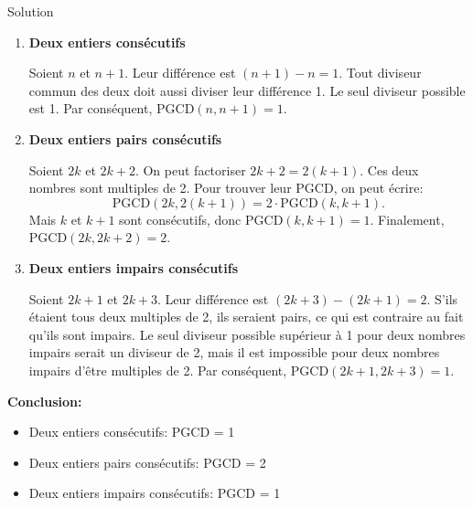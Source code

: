 \documentclass[a4paper,12pt]{article}
\begin{document}
\begin{solutionbox}{Solution}
    \begin{enumerate}
      \item \textbf{Deux entiers consécutifs}
    
      Soient $n$ et $n+1$.  
      Leur différence est $(n+1) - n = 1$.  
      Tout diviseur commun des deux doit aussi diviser leur différence 1.  
      Le seul diviseur possible est 1.  
      Par conséquent, $\mathrm{PGCD}(n, n+1) = 1$.
    
      \item \textbf{Deux entiers pairs consécutifs}
    
      Soient $2k$ et $2k+2$.  
      On peut factoriser $2k+2 = 2(k+1)$.  
      Ces deux nombres sont multiples de 2. Pour trouver leur PGCD, on peut écrire:
      \[
      \mathrm{PGCD}(2k, 2(k+1)) = 2 \cdot \mathrm{PGCD}(k, k+1).
      \]
      Mais $k$ et $k+1$ sont consécutifs, donc $\mathrm{PGCD}(k, k+1)=1$.  
      Finalement, $\mathrm{PGCD}(2k, 2k+2) = 2$.
    
      \item \textbf{Deux entiers impairs consécutifs}
    
      Soient $2k+1$ et $2k+3$.  
      Leur différence est $(2k+3) - (2k+1) = 2$.  
      S'ils étaient tous deux multiples de 2, ils seraient pairs, ce qui est contraire au fait qu'ils sont impairs.  
      Le seul diviseur possible supérieur à 1 pour deux nombres impairs serait un diviseur de 2, mais il est impossible pour deux nombres impairs d'être multiples de 2.  
      Par conséquent, $\mathrm{PGCD}(2k+1, 2k+3) = 1$.
    \end{enumerate}
    
    \textbf{Conclusion:}
    \begin{itemize}
      \item Deux entiers consécutifs: PGCD = 1
      \item Deux entiers pairs consécutifs: PGCD = 2
      \item Deux entiers impairs consécutifs: PGCD = 1
    \end{itemize}
    
    \end{solutionbox}

% 
% 
% 
\end{document}
